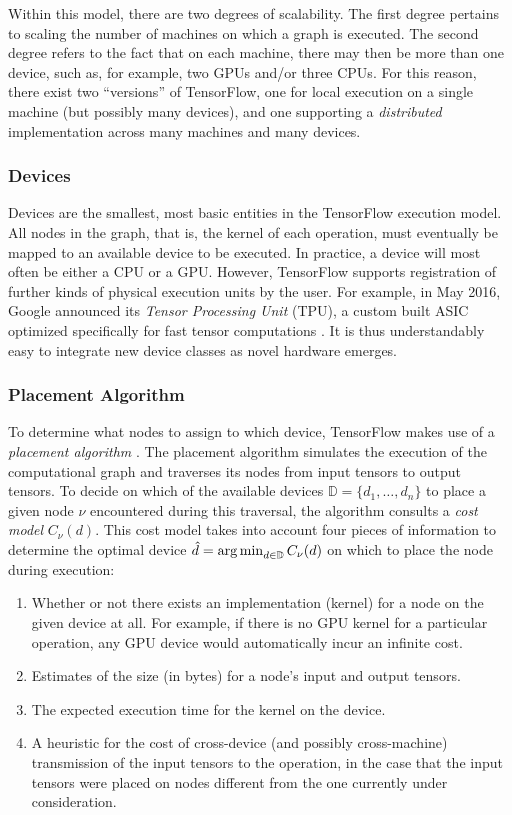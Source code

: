 Within this model, there are two degrees of scalability. The first degree
pertains to scaling the number of machines on which a graph is executed. The
second degree refers to the fact that on each machine, there may then be more
than one device, such as, for example, two GPUs and/or three CPUs. For this
reason, there exist two ``versions'' of TensorFlow, one for local execution on a
single machine (but possibly many devices), and one supporting a
\emph{distributed} implementation across many machines and many devices.

\subsubsection{Devices}\label{sec:model-exec-devices}

Devices are the smallest, most basic entities in the TensorFlow execution
model. All nodes in the graph, that is, the kernel of each operation, must
eventually be mapped to an available device to be executed. In practice, a
device will most often be either a CPU or a GPU. However, TensorFlow supports
registration of further kinds of physical execution units by the user. For
example, in May 2016, Google announced its \emph{Tensor Processing Unit} (TPU),
a custom built ASIC optimized specifically for fast tensor computations
\cite{tpu}. It is thus understandably easy to integrate new device classes as
novel hardware emerges.

\subsubsection{Placement Algorithm}\label{sec:model-exec-placement}

To determine what nodes to assign to which device, TensorFlow makes use of a
\emph{placement algorithm} \cite{tensorflow}. The placement algorithm simulates
the execution of the computational graph and traverses its nodes from input
tensors to output tensors. To decide on which of the available devices
$\mathbb{D} = \{d_1, \dots, d_n\}$ to place a given node $\nu$ encountered
during this traversal, the algorithm consults a \emph{cost model}
$C_\nu(d)$. This cost model takes into account four pieces of information to
determine the optimal device $\hat{d} = \operatorname*{arg\,min}_{d \in \mathbb{D}} C_\nu(d)$ on
which to place the node during execution:

\begin{enumerate}
  \item Whether or not there exists an implementation (kernel) for a node on the
    given device at all. For example, if there is no GPU kernel for a particular
    operation, any GPU device would automatically incur an infinite cost.
  \item Estimates of the size (in bytes) for a node's input and output tensors.
  \item The expected execution time for the kernel on the device.
  \item A heuristic for the cost of cross-device (and possibly cross-machine)
    transmission of the input tensors to the operation, in the case that the
    input tensors were placed on nodes different from the one currently under
    consideration.
\end{enumerate}

